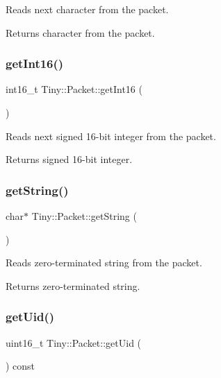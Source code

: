 Reads next character from the packet. \begin{DoxyReturn}{Returns}
character from the packet. 
\end{DoxyReturn}
\mbox{\label{classTiny_1_1Packet_a7dfed04418564f93dd4d2b4e9144a861}} 
\subsubsection{\texorpdfstring{get\+Int16()}{getInt16()}}
{\footnotesize\ttfamily int16\+\_\+t Tiny\+::\+Packet\+::get\+Int16 (\begin{DoxyParamCaption}{ }\end{DoxyParamCaption})\hspace{0.3cm}{\ttfamily [inline]}}

Reads next signed 16-\/bit integer from the packet. \begin{DoxyReturn}{Returns}
signed 16-\/bit integer. 
\end{DoxyReturn}
\mbox{\label{classTiny_1_1Packet_a8bc9a3b3f41be292f9c5ac566afeb04b}} 
\subsubsection{\texorpdfstring{get\+String()}{getString()}}
{\footnotesize\ttfamily char$\ast$ Tiny\+::\+Packet\+::get\+String (\begin{DoxyParamCaption}{ }\end{DoxyParamCaption})\hspace{0.3cm}{\ttfamily [inline]}}

Reads zero-\/terminated string from the packet. \begin{DoxyReturn}{Returns}
zero-\/terminated string. 
\end{DoxyReturn}
\mbox{\label{classTiny_1_1Packet_a65e342e15b9fa3e878393d268c4e69e4}} 
\subsubsection{\texorpdfstring{get\+Uid()}{getUid()}}
{\footnotesize\ttfamily uint16\+\_\+t Tiny\+::\+Packet\+::get\+Uid (\begin{DoxyParamCaption}{ }\end{DoxyParamCaption}) const\hspace{0.3cm}{\ttfamily [inline]}}

